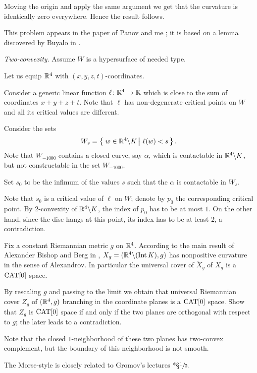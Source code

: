 Moving the origin and apply the same argument we get that the curvature is identically zero everywhere.
Hence the result follows. 

 This problem appears in the paper of Panov and me \cite{panov-petrunin}; it is based on a lemma discovered by Buyalo in \cite{buyalo}.

\textit{Two-convexity.}
Assume $W$ is a hypersurface of needed type.

Let us equip $\mathbb{R}^4$ with $(x,y,z,t)$-coordinates.

Consider a generic linear function $\ell\colon\mathbb{R}^4\to\mathbb{R}$
which is close to the sum of coordinates $x+y+z+t$.
Note that $\ell$
has non-degenerate critical points on $W$ and all its critical values are different.

Consider the sets 
$$W_s=\set{w\in \RR^4\backslash K}{\ell(w)<s}.$$
Note that $W_{-1000}$ contains a closed curve, say $\alpha$, 
which is contactable in $\mathbb{R}^4\backslash K$, 
but not constructable in the set $W_{-1000}$.

Set $s_0$ to be the infimum of the values $s$ such that
the $\alpha$ is contactable in $W_s$.

Note that $s_0$ is a critical value of $\ell$ on $W$;
denote by $p_0$ the corresponding critical point.
By 2-convexity of $\mathbb{R}^4\backslash K$,
the index of $p_0$ has to be at most $1$.
On the other hand, since the disc hangs at this point,
its index has to be at least $2$,
 a contradiction.

Fix a constant Riemannian metric $g$ on $\mathbb{R}^4$.
According to the main result of Alexander Bishop and Berg in \cite{ABB}, $X_g=(\mathbb{R}^4\backslash (\operatorname{\rm Int}\nolimits K),g)$ has nonpositive curvature in the sense of Alexandrov.
In particular the universal cover of $\tilde X_g$ of $X_g$ is a $\operatorname{\rm CAT}\nolimits[0]$ space.

By rescaling $g$ and passing to the limit we obtain that universal Riemannian cover $Z_g$ of $(\mathbb{R}^4,g)$ branching in the coordinate planes is a $\operatorname{\rm CAT}\nolimits[0]$ space.
Show that $Z_g$ is $\operatorname{\rm CAT}\nolimits[0]$ space if and only if the two planes are orthogonal with respect to $g$;
the later leads to a contradiction.

Note that the closed $1$-neighborhood of these two planes has two-convex complement, but the boundary of this neighborhood is not smooth.

The Morse-style is closely related 
to Gromov's lectures \cite{gromov-SGMC}*{\S$\sfrac{1}{2}$}.

